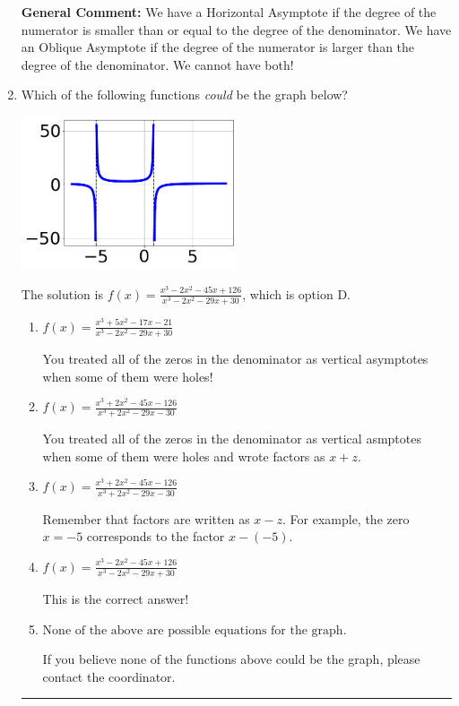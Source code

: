 \documentclass{extbook}[14pt]
\newcommand{\litem}[1]{\item #1

\rule{\textwidth}{0.4pt}}
\begin{document}
\begin{enumerate}
{\textbf{General Comment:} We have a Horizontal Asymptote if the degree of the numerator is smaller than or equal to the degree of the denominator. We have an Oblique Asymptote if the degree of the numerator is larger than the degree of the denominator. We cannot have both!
}
\litem{
Which of the following functions \textit{could} be the graph below?

\begin{center}
    \includegraphics[width=0.5\textwidth]{../Figures/identifyGraphOfRationalFunctionA.png}
\end{center}




The solution is \( f(x)=\frac{x^{3} -2 x^{2} -45 x + 126}{x^{3} -2 x^{2} -29 x + 30} \), which is option D.\begin{enumerate}[label=\Alph*.]
\item \( f(x)=\frac{x^{3} +5 x^{2} -17 x -21}{x^{3} -2 x^{2} -29 x + 30} \)

You treated all of the zeros in the denominator as vertical asymptotes when some of them were holes!
\item \( f(x)=\frac{x^{3} +2 x^{2} -45 x -126}{x^{3} +2 x^{2} -29 x -30} \)

You treated all of the zeros in the denominator as vertical asmptotes when some of them were holes and wrote factors as $x+z$.
\item \( f(x)=\frac{x^{3} +2 x^{2} -45 x -126}{x^{3} +2 x^{2} -29 x -30} \)

Remember that factors are written as $x-z$. For example, the zero $x=-5$ corresponds to the factor $x-(-5)$.
\item \( f(x)=\frac{x^{3} -2 x^{2} -45 x + 126}{x^{3} -2 x^{2} -29 x + 30} \)

This is the correct answer!
\item \( \text{None of the above are possible equations for the graph.} \)

If you believe none of the functions above could be the graph, please contact the coordinator.
\end{enumerate}

}
\end{enumerate}
\end{document}
